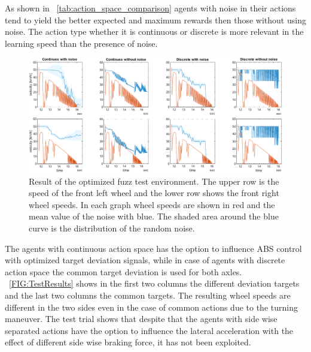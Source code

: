 \documentclass[a4paper, fleqn]{cas-dc}
\begin{document}
	
	As shown in ~\autoref{tab:action_space_comparison} agents with noise in their actions tend to yield the better expected and maximum rewards then those without using noise. The action type whether it is continuous or discrete is more relevant in the learning speed than the presence of noise. 
	
	\begin{figure}[ht!]
		\centering
		\includegraphics[width=\textwidth]{figures/SAC_all_wheelspeeds.pdf}
		\caption{Result of the optimized fuzz test environment. The upper row is the speed of the front left wheel and the lower row shows the front right wheel speeds. In each graph wheel speeds are shown in red and the mean value of the noise with blue. The shaded area around the blue curve is the distribution of the random noise.}
		\label{FIG:TestResults}
	\end{figure}
	
	The agents with continuous action space has the option to influence ABS control with optimized target deviation signals, while in case of agents with discrete action space the common target deviation is used for both axles. ~\autoref{FIG:TestResults} shows in the first two columns the different deviation targets and the last two columns the common targets. The resulting wheel speeds are different in the two sides even in the case of common actions due to the turning maneuver. The test trial shows that despite that the agents with side wise separated actions have the option to influence the lateral acceleration with the effect of different side wise braking force, it has not been exploited.
			
	
\end{document}
